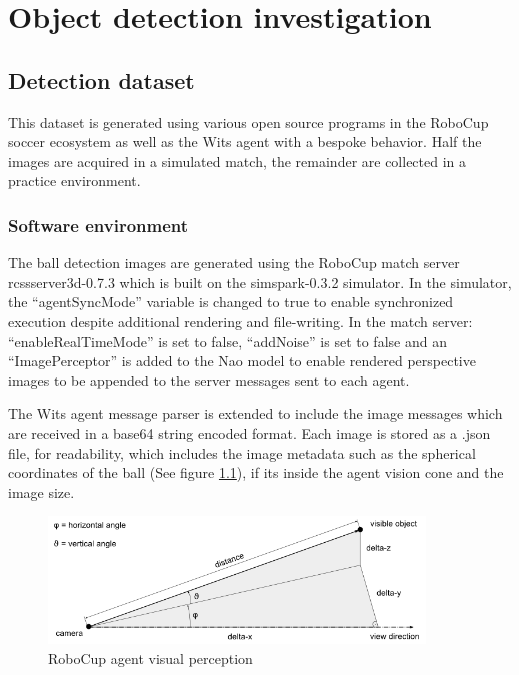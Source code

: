 \documentclass[a4paper,twoside,12pt]{report}
\begin{document}
\chapter{Object detection investigation}

\section{Detection dataset}
This dataset is generated using various open source programs in the RoboCup soccer ecosystem as well as the Wits agent with a bespoke behavior. Half the images are acquired in a simulated match, the remainder are collected in a practice environment.

\subsection{Software environment}
The ball detection images are generated using the RoboCup match server rcssserver3d-0.7.3 which is built on the simspark-0.3.2 simulator. In the simulator, the ``agentSyncMode'' variable is changed to true to enable synchronized execution despite additional rendering and file-writing. In the match server: ``enableRealTimeMode'' is set to false, ``addNoise'' is set to false and an ``ImagePerceptor'' is added to the Nao model to enable rendered perspective images to be appended to the server messages \citep{perceptors} sent to each agent.  

The Wits agent message parser is extended to include the image messages which are received in a base64 string encoded format. Each image is stored as a .json file, for readability, which includes the image metadata such as the spherical coordinates of the ball (See figure \ref{fig:spherical}), if its inside the agent vision cone and the image size. 

\begin{figure}[h!]
\begin{center}
\includegraphics[width=10cm]{images/Vision_Perception.png}
\caption{RoboCup agent visual perception \citep{perceptors}}
\label{fig:spherical}
\end{center}
\end{figure}
\end{document}
